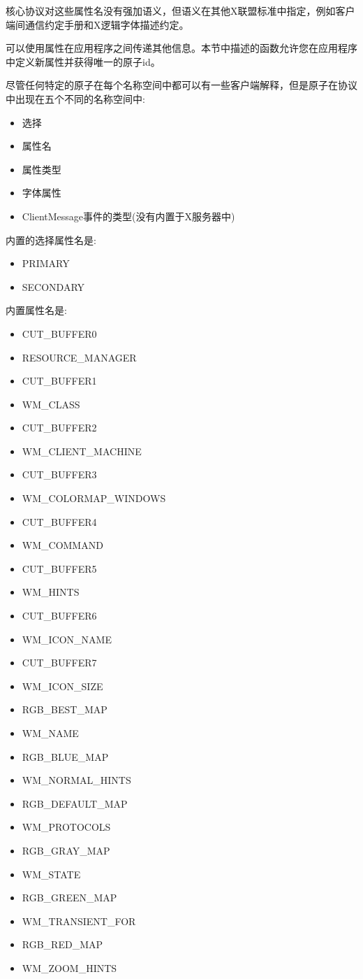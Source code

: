 核心协议对这些属性名没有强加语义，但语义在其他X联盟标准中指定，例如客户端间通信约定手册和X逻辑字体描述约定。

可以使用属性在应用程序之间传递其他信息。本节中描述的函数允许您在应用程序中定义新属性并获得唯一的原子id。

尽管任何特定的原子在每个名称空间中都可以有一些客户端解释，但是原子在协议中出现在五个不同的名称空间中:

\begin{itemize}
	\item 选择
	\item 属性名
	\item 属性类型
	\item 字体属性
	\item ClientMessage事件的类型(没有内置于X服务器中)
\end{itemize}

内置的选择属性名是:

\begin{itemize}
	\item PRIMARY
	\item SECONDARY
\end{itemize}

内置属性名是:

\begin{itemize}
	\item CUT\_BUFFER0
	\item RESOURCE\_MANAGER
	\item CUT\_BUFFER1
	\item WM\_CLASS
	\item CUT\_BUFFER2
	\item WM\_CLIENT\_MACHINE
	\item CUT\_BUFFER3
	\item WM\_COLORMAP\_WINDOWS
	\item CUT\_BUFFER4
	\item WM\_COMMAND
	\item CUT\_BUFFER5
	\item WM\_HINTS
	\item CUT\_BUFFER6
	\item WM\_ICON\_NAME
	\item CUT\_BUFFER7
	\item WM\_ICON\_SIZE
	\item RGB\_BEST\_MAP
	\item WM\_NAME
	\item RGB\_BLUE\_MAP
	\item WM\_NORMAL\_HINTS
	\item RGB\_DEFAULT\_MAP
	\item WM\_PROTOCOLS
	\item RGB\_GRAY\_MAP
	\item WM\_STATE
	\item RGB\_GREEN\_MAP
	\item WM\_TRANSIENT\_FOR
	\item RGB\_RED\_MAP
	\item WM\_ZOOM\_HINTS
\end{itemize}

